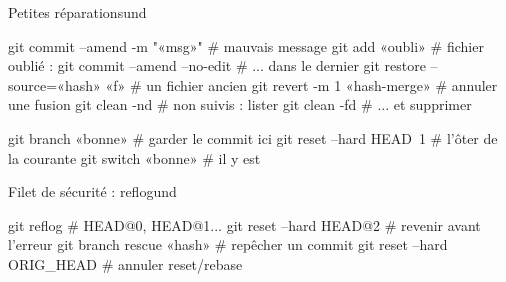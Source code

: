 \documentclass{article}
\begin{document}
\begin{colonne}
\begin{bloc}{Petites réparations}{und}
\begin{code}
git commit --amend -m "«msg»"  # mauvais message
git add «oubli»                  # fichier oublié :
git commit --amend --no-edit   # ... dans le dernier
git restore --source=«hash» «f»    # un fichier ancien
git revert -m 1 «hash-merge»     # annuler une fusion
git clean -nd                  # non suivis : lister
git clean -fd                  # ... et supprimer
\end{code}
\begin{code}
git branch «bonne»         # garder le commit ici
git reset --hard HEAD~1  # l'ôter de la courante
git switch «bonne»         # il y est
\end{code}
\end{bloc}

\begin{bloc}{Filet de sécurité : reflog}{und}
\begin{code}
git reflog                  # HEAD@{0}, HEAD@{1}...
git reset --hard HEAD@{2}   # revenir avant l'erreur
git branch rescue «hash»      # repêcher un commit
git reset --hard ORIG_HEAD  # annuler reset/rebase
\end{code}
\end{bloc}
\end{colonne}\colbreak
\end{document}
